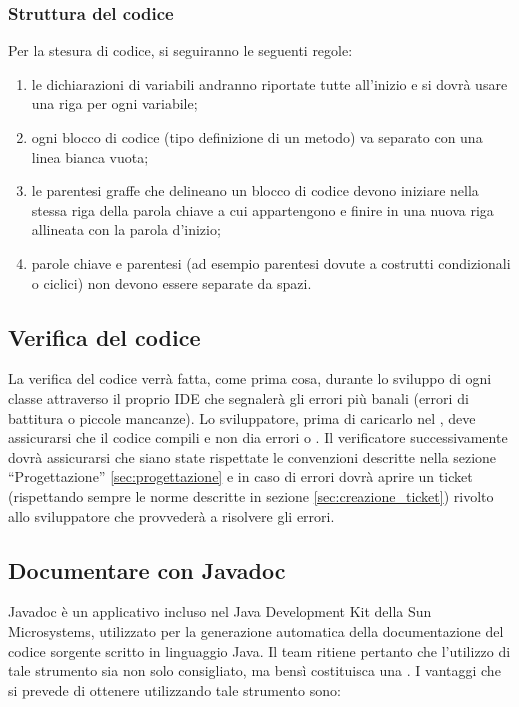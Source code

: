 {\subsubsection{Struttura del codice}
Per la stesura di codice, si seguiranno le seguenti regole:
\begin{enumerate}
\item le dichiarazioni di variabili andranno riportate tutte all'inizio e si dovrà usare una riga per ogni variabile;
\item ogni blocco di codice (tipo definizione di un metodo) va separato  con una linea bianca vuota;
\item le parentesi graffe che delineano un blocco di codice devono iniziare nella stessa riga della parola chiave a cui appartengono e finire in una nuova riga allineata con la parola d'inizio;
\item parole chiave e parentesi (ad esempio parentesi dovute a costrutti condizionali o ciclici) non devono essere separate da spazi.
\end{enumerate}

\subsection{Verifica del codice}
La verifica del codice verrà fatta, come prima cosa, durante lo sviluppo di ogni classe attraverso il proprio IDE che segnalerà gli errori più banali (errori di battitura o piccole mancanze). Lo sviluppatore, prima di caricarlo nel , deve assicurarsi che il codice compili e non dia errori o . Il verificatore successivamente dovrà assicurarsi che siano state rispettate le convenzioni descritte nella sezione ``Progettazione'' \ref{sec:progettazione} e in caso di errori dovrà aprire un ticket (rispettando sempre le norme descritte in sezione \ref{sec:creazione_ticket}) rivolto allo sviluppatore che provvederà a risolvere gli errori.

\subsection{Documentare con Javadoc}

Javadoc è un applicativo incluso nel Java Development Kit della Sun Microsystems, utilizzato per la generazione automatica della documentazione del codice sorgente scritto in linguaggio Java. Il team ritiene pertanto che l'utilizzo di tale strumento sia non solo consigliato, ma bensì costituisca una . I vantaggi che si prevede di ottenere utilizzando tale strumento sono:

}
